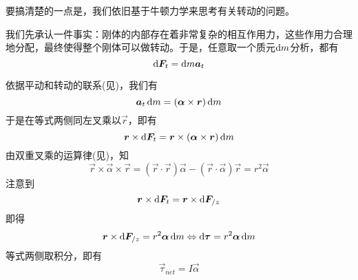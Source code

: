 \chapter[转动动力学]{}
\begin{prove}[Concepts in Dynamics\qquad$\vec{\tau}_{net}=I\vec{\alpha}$]
	要搞清楚的一点是，我们依旧基于牛顿力学来思考有关转动的问题。
	
	我们先承认一件事实：刚体的内部存在着非常复杂的相互作用力，这些作用力合理地分配，最终使得整个刚体可以做转动。于是，任意取一个质元$\dif m$分析，都有\[\dif \vec{F}_t=\dif m\vec{a}_t\]
	
	依据平动和转动的联系(见)，我们有
	\[\vec{a}_t\dif m=(\vec{\alpha}\times\vec{r})\dif m\]
	于是在等式两侧同左叉乘以$\vec{r}$，即有
	\[\vec{r}\times\dif\vec{F}_t= \vec{r}\times(\vec{\alpha}\times\vec{r})\dif m\]
	由双重叉乘的运算律(见)，知
	\[\vec{r}\times\vec{\alpha}\times\vec{r}=(\vec{r}\cdot\vec{r})\vec{\alpha}-(\vec{r}\cdot\vec{\alpha})\vec{r}=r^2\vec{\alpha}\]
	注意到
	\[\vec{r}\times\dif\vec{F}_t=\vec{r}\times\dif\vec{F}_{/z}\]
	即得
	\[\vec{r}\times\dif\vec{F}_{/z}=r^2\vec{\alpha}\dif m\Leftrightarrow\dif\vec{\tau}=r^2\vec{\alpha}\dif m\]
	等式两侧取积分，即有
	\[\vec{\tau}_{net}=I\vec{\alpha}\]
\end{prove}

